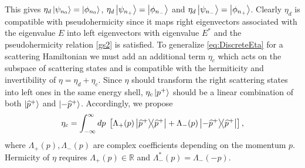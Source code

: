 This gives $\eta_d \ket{\psi_{n_0}} = \ket{\phi_{n_0}}$, $\eta_d\ket{\psi_{n_+}} = \ket{\phi_{n_-}}$ and $\eta_d\ket{\psi_{n_-}} = \ket{\phi_{n_+}}$. Clearly $\eta_d$ is compatible with pseudohermicity since it maps right eigenvectors associated with the eigenvalue $E$ into left eigenvectors with eigenvalue $E^*$ and the pseudohermicity relation \eqref{gs2} is satisfied. To generalize \eqref{eq:DiscreteEta} for a scattering Hamiltonian we must add an additional term $\eta_c$ which acts on the subspace of scattering states and is compatible with the hermiticity and invertibility of $\eta = \eta_d + \eta_c$. Since $\eta$ should transform the right scattering states into left ones in the same energy shell, $\eta_c \ket{p^+}$ should be a linear combination of both $\ket{\widehat{p}^+}$ and $\ket{-\widehat{p}^+}$. Accordingly, we propose
%
\begin{equation}
    \eta_c = \int_{-\infty}^\infty dp\; \left[\Lambda_+(p)\ketbra{\widehat{p}^+}{\widehat{p}^+} + \Lambda_-(p)\ketbra{-\widehat{p}^+}{\widehat{p}^+}\right],
    \label{eq:EtaContinuousPart}
\end{equation}
%
where $\Lambda_+(p), \Lambda_-(p)$ are complex coefficients depending on the momentum $p$. Hermicity of $\eta$ requires $\Lambda_+(p) \in \mathbb{R}$ and $\Lambda_-^*(p) =\Lambda_-(-p)$.

